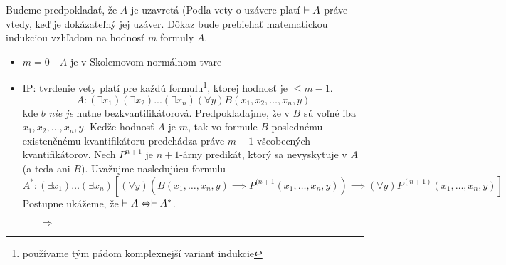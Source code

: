 \begin{dokaz}
    Budeme predpokladať, že $A$ je uzavretá (Podľa vety o uzávere
    platí $\vdash A$ práve vtedy, keď je dokázateľný jej uzáver.
    Dôkaz bude prebiehať matematickou indukciou vzhľadom na hodnosť
    $m$ formuly $A$.
    \begin{itemize}
        \item $m=0$ - $A$ je v Skolemovom normálnom tvare
        \item IP: tvrdenie vety platí pre každú
        formulu\footnote{používame tým pádom komplexnejší variant
        indukcie}, ktorej hodnosť je $\le m-1$.
        \begin{equation}
            A: (\exists x_1) (\exists x_2) ... (\exists x_n) (\forall y)
            B(x_1,x_2,\dots,x_n,y)
        \end{equation}
        kde $b$ \emph{nie je} nutne bezkvantifikátorová.
        Predpokladajme, že v $B$ sú voľné iba $x_1,x_2,\dots,x_n,y$.
        Keďže hodnosť $A$ je $m$, tak vo formule $B$ poslednému
        existenčnému kvantifikátoru predchádza práve $m-1$ všeobecných
        kvantifikátorov.
        Nech $P^{n+1}$ je $n+1$-árny predikát, ktorý sa nevyskytuje v
        $A$ (a teda ani $B$). Uvažujme nasledujúcu formulu
        \begin{equation}
            A^*: (\exists x_1) \dots (\exists x_n) \left[
                (\forall y) (B(x_1,\dots,x_n,y) \implies 
                    P^{(n+1}(x_1,\dots,x_n,y)) \implies 
                    (\forall y) P^{(n+1)} (x_1,\dots,x_n,y)
            \right]
        \end{equation}
        Postupne ukážeme, že $\vdash A \Leftrightarrow \vdash
        A^*$.
        \begin{itemize}
        \item[$\Rightarrow$]
\end{itemize}
\end{itemize}
\end{dokaz}
